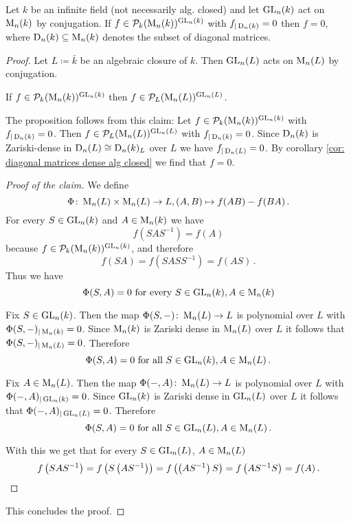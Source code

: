 \begin{prop}
  Let $k$ be an infinite field (not necessarily alg. closed) and let $\operatorname{GL}_n(k)$ act on $\operatorname{M}_n(k)$ by conjugation.
  If $f \in \mathcal{P}_k(\operatorname{M}_n(k))^{\operatorname{GL}_n(k)}$ with $f_{|\operatorname{D}_n(k)} = 0$ then $f = 0$, where $\operatorname{D}_n(k) \subseteq \operatorname{M}_n(k)$ denotes the subset of diagonal matrices.
\end{prop}
\begin{proof}
  Let $L \coloneqq \bar{k}$ be an algebraic closure of $k$.
  Then $\operatorname{GL}_n(L)$ acts on $\operatorname{M}_n(L)$ by conjugation.
  
  \begin{claim}
    If $f \in \mathcal{P}_k(\operatorname{M}_n(k))^{\operatorname{GL}_n(k)}$ then $f \in \mathcal{P}_L(\operatorname{M}_n(L))^{\operatorname{GL}_n(L)}$.
  \end{claim}
  
  The proposition follows from this claim:
  Let $f \in \mathcal{P}_k(\operatorname{M}_n(k))^{\operatorname{GL}_n(k)}$ with $f_{|\operatorname{D}_n(k)} = 0$.
  Then $f \in \mathcal{P}_L(\operatorname{M}_n(L))^{\operatorname{GL}_n(L)}$ with $f_{|\operatorname{D}_n(k)} = 0$.
  Since $\operatorname{D}_n(k)$ is Zariski-dense in $\operatorname{D}_n(L) \cong \operatorname{D}_n(k)_L$ over $L$ we have $f_{|\operatorname{D}_n(L)} = 0$.
  By corollary \ref{cor: diagonal matrices dense alg closed} we find that $f = 0$.
  
  \begin{proof}[Proof of the claim]
    We define
    \[
              \Phi
      \colon  \operatorname{M}_n(L) \times \operatorname{M}_n(L)
      \to     L,
              (A,B)
      \mapsto f(AB)-f(BA) \,.
    \]
    For every $S \in \operatorname{GL}_n(k)$ and $A \in \operatorname{M}_n(k)$ we have
    \[
        f\left( SAS^{-1} \right)
      = f(A)
    \]
    because $f \in \mathcal{P}_k(\operatorname{M}_n(k))^{\operatorname{GL}_n(k)}$, and therefore
    \[
        f(SA)
      = f\left (SASS^{-1} \right)
      = f(AS) \,.
    \]
    Thus we have
    \[
        \Phi(S,A)
      = 0
      \text{ for every }
      S \in \operatorname{GL}_n(k),
      A \in \operatorname{M}_n(k)
    \]
    
    Fix $S \in \operatorname{GL}_n(k)$.
    Then the map $\Phi(S, -) \colon \operatorname{M}_n(L) \to L$ is polynomial over $L$ with $\Phi(S,-)_{|\operatorname{M}_n(k)} = 0$.
    Since $\operatorname{M}_n(k)$ is Zariski dense in $\operatorname{M}_n(L)$ over $L$ it follows that $\Phi(S,-)_{|\operatorname{M}_n(L)} = 0$.
    Therefore
    \[
        \Phi(S,A)
      = 0
      \text{ for all }
      S \in \operatorname{GL}_n(k),
      A \in \operatorname{M}_n(L) \,.
    \]
    
    Fix $A \in \operatorname{M}_n(L)$.
    Then the map $\Phi(-,A) \colon \operatorname{M}_n(L) \to L$ is polynomial over $L$ with $\Phi(-,A)_{|\operatorname{GL}_n(k)} = 0$.
    Since $\operatorname{GL}_n(k)$ is Zariski dense in $\operatorname{GL}_n(L)$ over $L$ it follows that $\Phi(-,A)_{|\operatorname{GL}_n(L)} = 0$.
    Therefore
    \[
        \Phi(S,A)
      = 0
      \text{ for all }
      S \in \operatorname{GL}_n(L),
      A \in \operatorname{M}_n(L) \,.
    \]
    
    With this we get that for every $S \in \operatorname{GL}_n(L)$, $A \in \operatorname{M}_n(L)$
    \[
        f\left( SAS^{-1} \right)
      = f\left( S \left( AS^{-1} \right) \right)
      = f\left( \left( AS^{-1} \right) S \right)
      = f\left( AS^{-1}S \right)
      = f(A) \,.
      \qedhere
    \]
  \end{proof}
  
  This concludes the proof.
\end{proof}





